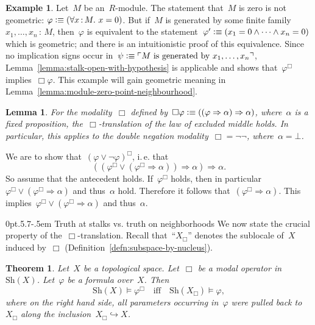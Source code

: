 \documentclass[10pt,reqno,a4paper]{amsbook}
\makeatletter
\theoremstyle{definition}
\newtheorem{ex}[defn]{Example}
\theoremstyle{plain}
\newtheorem{lemma}[defn]{Lemma}
\newtheorem{thm}[defn]{Theorem}
\theoremstyle{remark}
\newcommand{\Sh}{\mathrm{Sh}}
\newcommand{\?}{\,{:}\,}
\renewcommand{\_}{\mathpunct{.}\,}
\newcommand{\speak}[1]{\ulcorner\text{\textnormal{#1}}\urcorner}
\newcommand{\ie}{i.\,e.\@\xspace}
\newcommand{\vs}{vs.\@\xspace}
\newcommand{\XXXh}[1]{}
\newcommand{\defequiv}{\vcentcolon\equiv}
\renewenvironment{proof}[1][\proofname]{\par
  \pushQED{\qed}%
  \normalfont \topsep6\p@\@plus6\p@\relax
  \trivlist
  \item[\hskip\labelsep
        \itshape
    #1\@addpunct{.}]\ignorespaces
}{%
  \popQED\endtrivlist\@endpefalse
}
\def\subsection{\@startsection{subsection}{2}%
  {0pt}{.5\linespacing\@plus.7\linespacing}{-.5em}%
  {\normalfont\bfseries}}
\makeatother
\begin{document}
\begin{ex}\label{ex:module-zero-geometric}
Let~$M$ be an~$R$-module. The statement that~$M$ is zero is not
geometric: $\varphi \defequiv (\forall x\?M\_ x = 0)$. But if~$M$ is generated by some finite
family~$x_1,\ldots,x_n\?M$, then~$\varphi$ is equivalent to the
statement~$\varphi' \defequiv (x_1 = 0
\wedge \cdots \wedge x_n = 0)$ which is geometric; and there is an
intuitionistic proof of this equivalence. Since no implication signs occur
in~$\psi \defequiv \speak{$M$ is generated by~$x_1,\ldots,x_n$}$, Lemma~\ref{lemma:stalk-open-with-hypothesis} is
applicable and shows that~$\varphi^\Box$ implies~$\Box\varphi$.
This example will gain geometric meaning in
Lemma~\ref{lemma:module-zero-point-neighbourhood}.
\end{ex}

\begin{lemma}For the modality~$\Box$ defined by~$\Box\varphi \defequiv ((\varphi
      \Rightarrow \alpha) \Rightarrow \alpha)$, where~$\alpha$ is a fixed
proposition, the~$\Box$-translation of the law of excluded middle holds.
In particular, this applies to the double negation modality~$\Box = \neg\neg$, where~$\alpha =
\bot$.\end{lemma}
\begin{proof}We are to show that~$(\varphi \vee \neg\varphi)^\Box$, \ie that
\[ ((\varphi^\Box \vee (\varphi^\Box \Rightarrow \alpha)) \Longrightarrow
    \alpha) \Longrightarrow \alpha. \]
So assume that the antecedent holds. If~$\varphi^\Box$ holds, then in
particular~$\varphi^\Box \vee (\varphi^\Box \Rightarrow \alpha)$ and thus~$\alpha$
hold. Therefore it follows that~$(\varphi^\Box \Rightarrow \alpha)$. This
implies~$\varphi^\Box \vee (\varphi^\Box \Rightarrow \alpha)$ and
thus~$\alpha$.
\end{proof}


\subsection{\texorpdfstring{Truth at stalks \vs truth on neighborhoods}{Truth
at stalks vs. truth on neighborhoods}}\label{sect:spreading}
We now state the crucial property of the~$\Box$-translation. Recall
that~``$X_\Box$'' denotes the sublocale of~$X$ induced by~$\Box$
(Definition~\ref{defn:subspace-by-nucleus}).
\begin{thm}\label{thm:box-translation-semantically}
Let~$X$ be a topological space. Let~$\Box$ be a modal operator
in~$\Sh(X)$. Let~$\varphi$ be a formula over~$X$. Then
\[ \Sh(X) \models \varphi^\Box \quad\text{iff}\quad
  \Sh(X_\Box) \models \varphi, \]
where on the right hand side, all parameters occurring in~$\varphi$ were pulled
back to~$X_\Box$ along the inclusion~$X_\Box \hookrightarrow X$.
\end{thm}
\XXXh{think about powersets appearing as domains of quantification}
\end{document}
